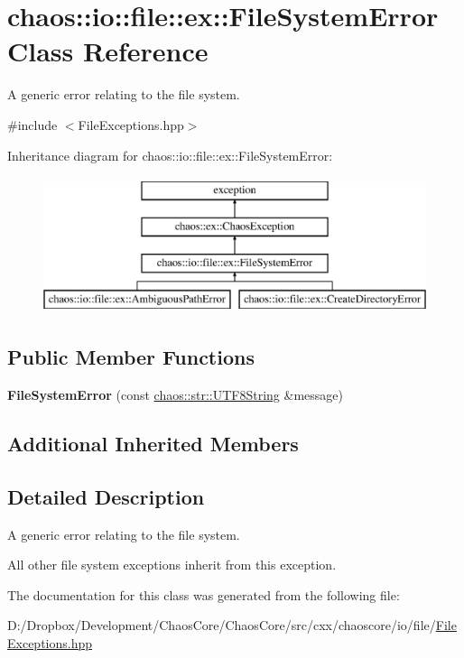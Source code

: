 \hypertarget{classchaos_1_1io_1_1file_1_1ex_1_1_file_system_error}{}\section{chaos\+:\+:io\+:\+:file\+:\+:ex\+:\+:File\+System\+Error Class Reference}
\label{classchaos_1_1io_1_1file_1_1ex_1_1_file_system_error}


A generic error relating to the file system.  




{\ttfamily \#include $<$File\+Exceptions.\+hpp$>$}

Inheritance diagram for chaos\+:\+:io\+:\+:file\+:\+:ex\+:\+:File\+System\+Error\+:\begin{figure}[H]
\begin{center}
\leavevmode
\includegraphics[height=4.000000cm]{classchaos_1_1io_1_1file_1_1ex_1_1_file_system_error}
\end{center}
\end{figure}
\subsection*{Public Member Functions}
\begin{DoxyCompactItemize}
\item 
\hypertarget{classchaos_1_1io_1_1file_1_1ex_1_1_file_system_error_a3a7ccd38be7d46a8e1414ce8ab38506e}{}{\bfseries File\+System\+Error} (const \hyperlink{classchaos_1_1str_1_1_u_t_f8_string}{chaos\+::str\+::\+U\+T\+F8\+String} \&message)\label{classchaos_1_1io_1_1file_1_1ex_1_1_file_system_error_a3a7ccd38be7d46a8e1414ce8ab38506e}

\end{DoxyCompactItemize}
\subsection*{Additional Inherited Members}


\subsection{Detailed Description}
A generic error relating to the file system. 

All other file system exceptions inherit from this exception. 

The documentation for this class was generated from the following file\+:\begin{DoxyCompactItemize}
\item 
D\+:/\+Dropbox/\+Development/\+Chaos\+Core/\+Chaos\+Core/src/cxx/chaoscore/io/file/\hyperlink{_file_exceptions_8hpp}{File\+Exceptions.\+hpp}\end{DoxyCompactItemize}
